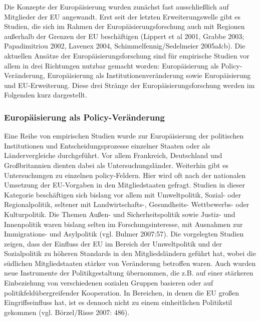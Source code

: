 Die Konzepte der Europäisierung wurden zunächst fast ausschließlich auf Mitglieder der EU angewandt. Erst seit der letzten Erweiterungswelle gibt es Studien, die sich im Rahmen der Europäisierungsforschung auch mit Regionen außerhalb der Grenzen der EU beschäftigen (Lippert et al 2001, Grabbe 2003; Papadimitriou 2002, Lavenex 2004, Schimmelfennig/Sedelmeier 2005a\&b). Die aktuellen Ansätze der Europäisierungsforschung sind für empirische Studien vor allem in drei Richtungen nutzbar gemacht worden: Europäisierung als Policy-Veränderung, Europäisierung als Institutionenveränderung sowie Europäisierung und EU-Erweiterung. Diese drei Stränge der Europäisierungsforschung werden im Folgenden kurz dargestellt.
\subsubsection{Europäisierung als Policy-Veränderung}
Eine Reihe von empirischen Studien wurde zur Europäisierung der politischen Institutionen und Entscheidungsprozesse einzelner Staaten oder als Ländervergleiche durchgeführt. Vor allem Frankreich, Deutschland und Großbritannien dienten dabei als Untersuchungsländer. Weiterhin gibt es Untersuchungen zu einzelnen policy-Feldern. Hier wird oft nach der nationalen Umsetzung der EU-Vorgaben in den Mitgliedstaaten gefragt. Studien in dieser Kategorie beschäftigen sich bislang vor allem mit Umweltpolitik, Sozial- oder Regionalpolitik, seltener mit Landwirtschafts-, Gesundheits- Wettbewerbs- oder Kulturpolitik. Die Themen Außen- und Sicherheitspolitik sowie Justiz- und Innenpolitik waren bislang selten im Forschungsinteresse, mit Ausnahmen zur Immigrations- und Asylpolitik (vgl. Bulmer 2007:57). Die vorgelegten Studien zeigen, dass der Einfluss der EU im Bereich der Umweltpolitik und der Sozialpolitik zu höheren Standards in den Mitgliedsländern geführt hat, wobei die südlichen Mitgliedstaaten stärker von Veränderung betroffen waren. Auch wurden neue Instrumente der Politikgestaltung übernommen, die z.B. auf einer stärkeren Einbeziehung von verschiedenen sozialen Gruppen basieren oder auf politikfeldübergreifender Kooperation. In Bereichen, in denen die EU großen Eingriffseinfluss hat, ist es dennoch nicht zu einem einheitlichen Politikstil gekommen (vgl. Börzel/Risse 2007: 486).

